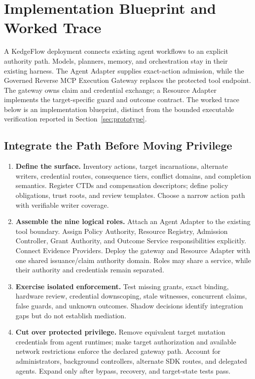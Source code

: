 \section{Implementation Blueprint and Worked Trace}
\label{sec:implementation}

A KedgeFlow deployment connects existing agent workflows to an explicit authority path. Models, planners, memory, and orchestration stay in their existing harness. The Agent Adapter supplies exact-action admission, while the Governed Reverse MCP Execution Gateway replaces the protected tool endpoint. The gateway owns claim and credential exchange; a Resource Adapter implements the target-specific guard and outcome contract. The worked trace below is an implementation blueprint, distinct from the bounded executable verification reported in Section~\ref{sec:prototype}.

\subsection{Integrate the Path Before Moving Privilege}
\begin{enumerate}
\item \textbf{Define the surface.} Inventory actions, target incarnations, alternate writers, credential routes, consequence tiers, conflict domains, and completion semantics. Register CTDs and compensation descriptors; define policy obligations, trust roots, and review templates. Choose a narrow action path with verifiable writer coverage.
\item \textbf{Assemble the nine logical roles.} Attach an Agent Adapter to the existing tool boundary. Assign Policy Authority, Resource Registry, Admission Controller, Grant Authority, and Outcome Service responsibilities explicitly. Connect Evidence Providers. Deploy the gateway and Resource Adapter with one shared issuance/claim authority domain. Roles may share a service, while their authority and credentials remain separated.
\item \textbf{Exercise isolated enforcement.} Test missing grants, exact binding, hardware review, credential downscoping, stale witnesses, concurrent claims, false guards, and unknown outcomes. Shadow decisions identify integration gaps but do not establish mediation.
\item \textbf{Cut over protected privilege.} Remove equivalent target mutation credentials from agent runtimes; make target authorization and available network restrictions enforce the declared gateway path. Account for administrators, background controllers, alternate SDK routes, and delegated agents. Expand only after bypass, recovery, and target-state tests pass.
\end{enumerate}

